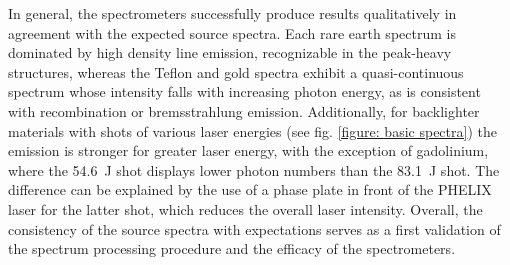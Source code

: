 In general, the spectrometers successfully produce results qualitatively in agreement with the expected source spectra. Each rare earth spectrum is dominated by high density line emission, recognizable in the peak-heavy structures, whereas the Teflon and gold spectra exhibit a quasi-continuous spectrum whose intensity falls with increasing photon energy, as is consistent with recombination or bremsstrahlung emission. Additionally, for backlighter materials with shots of various laser energies (see fig. \ref{figure: basic spectra}) the emission is stronger for greater laser energy, with the exception of gadolinium, where the \SI{54.6}{\joule} shot displays lower photon numbers than the \SI{83.1}{\joule} shot. The difference can be explained by the use of a phase plate in front of the PHELIX laser for the latter shot, which reduces the overall laser intensity. Overall, the consistency of the source spectra with expectations serves as a first validation of the spectrum processing procedure and the efficacy of the spectrometers.

